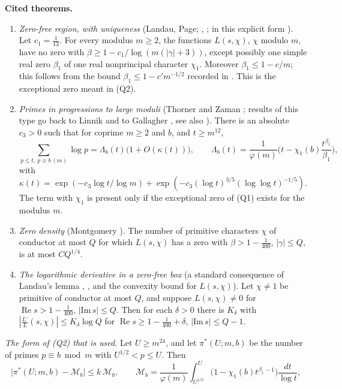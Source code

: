 \documentclass[11pt,letterpaper]{article}
\newcommand{\re}{\operatorname{Re}}
\begin{document}
\textbf{Cited theorems.}
\begin{enumerate}[label=\textup{(Q\arabic*)},leftmargin=2.6em]
\item \emph{Zero-free region, with uniqueness} (Landau, Page; \cite[Ch.~14]{Dav00}, \cite{Pag35}; in this
explicit form \cite[\S1]{TZ21}). Let $c_1=\frac1{13}$. For every modulus $m\ge2$, the functions $L(s,\chi)$,
$\chi$ modulo $m$, have no zero with
$\beta\ge1-c_1/\log(m(|\gamma|+3))$, except possibly one simple real zero $\beta_1$ of one real nonprincipal
character $\chi_1$. Moreover $\beta_1\le1-c/m$; this follows from the bound $\beta_1\le1-c'm^{-1/2}$ recorded in \cite[\S1]{TZ21}. This is the exceptional zero meant in (Q2).
\item \emph{Primes in progressions to large moduli} (Thorner and Zaman \cite[Corollary 1.4]{TZ21}; results
of this type go back to Linnik and to Gallagher \cite{Gal70}, see also \cite{Bom87}). There is an absolute
$c_3>0$ such that for coprime $m\ge2$ and $b$, and $t\ge m^{12}$,
\begin{equation}\label{D:115}
 \sum_{p\le t,\ p\equiv b\,(m)}\log p=\Lambda_b(t)\big(1+O(\kappa(t))\big),\qquad
 \Lambda_b(t)=\frac1{\varphi(m)}\Big(t-\chi_1(b)\frac{t^{\beta_1}}{\beta_1}\Big),
\end{equation}
with $\kappa(t)=\exp(-c_3\log t/\log m)+\exp(-c_3(\log t)^{3/5}(\log\log t)^{-1/5})$. The term with $\chi_1$
is present only if the exceptional zero of (Q1) exists for the modulus $m$.
\item \emph{Zero density} (Montgomery \cite[Theorem 12.2]{Mon71}). The number of primitive characters $\chi$
of conductor at most $Q$ for which $L(s,\chi)$ has a zero with $\beta>1-\frac1{400}$, $|\gamma|\le Q$, is at
most $CQ^{1/4}$.
\item \emph{The logarithmic derivative in a zero-free box} (a standard consequence of Landau's lemma
\cite[\S3.9]{Tit86}, \cite[Lemma 6.3]{MV07}, and the convexity bound for $L(s,\chi)$). Let $\chi\ne1$ be primitive of conductor at most $Q$, and suppose $L(s,\chi)\ne0$ for
$\re s>1-\frac1{400}$, $|\mathrm{Im}\,s|\le Q$. Then for each $\delta>0$ there is $K_\delta$ with
$|\frac{L'}L(s,\chi)|\le K_\delta\log Q$ for $\re s\ge1-\frac1{400}+\delta$, $|\mathrm{Im}\,s|\le Q-1$.
\end{enumerate}
\emph{The form of (Q2) that is used.} Let $U\ge m^{24}$, and let
$\pi^*(U;m,b)$ be the number of primes $p\equiv b\bmod m$ with $U^{1/2}<p\le U$. Then
\begin{equation}\label{III:Q2}
 \big|\pi^*(U;m,b)-\mathcal M_b\big|\le k\,\mathcal M_b,\qquad
 \mathcal M_b=\frac1{\varphi(m)}\int_{U^{1/2}}^U\big(1-\chi_1(b)t^{\beta_1-1}\big)\frac{dt}{\log t},
\end{equation}
\end{document}
